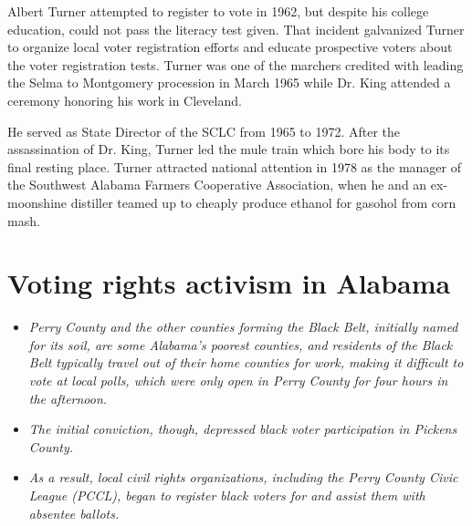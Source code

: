 Albert Turner attempted to register to vote in 1962, but despite his
college education, could not pass the literacy test given. That incident
galvanized Turner to organize local voter registration efforts and
educate prospective voters about the voter registration tests. Turner
was one of the marchers credited with leading the Selma to Montgomery
procession in March 1965 while Dr. King attended a ceremony honoring his
work in Cleveland.

He served as State Director of the SCLC from 1965 to 1972. After the
assassination of Dr. King, Turner led the mule train which bore his body
to its final resting place. Turner attracted national attention in 1978
as the manager of the Southwest Alabama Farmers Cooperative Association,
when he and an ex-moonshine distiller teamed up to cheaply produce
ethanol for gasohol from corn mash.

\section{Voting rights activism in
Alabama}\label{voting-rights-activism-in-alabama}

\begin{itemize}
\item
  \emph{Perry County and the other counties forming the Black Belt,
  initially named for its soil, are some Alabama's poorest counties, and
  residents of the Black Belt typically travel out of their home
  counties for work, making it difficult to vote at local polls, which
  were only open in Perry County for four hours in the afternoon.}
\item
  \emph{The initial conviction, though, depressed black voter
  participation in Pickens County.}
\item
  \emph{As a result, local civil rights organizations, including the
  Perry County Civic League (PCCL), began to register black voters for
  and assist them with absentee ballots.}
\end{itemize}

